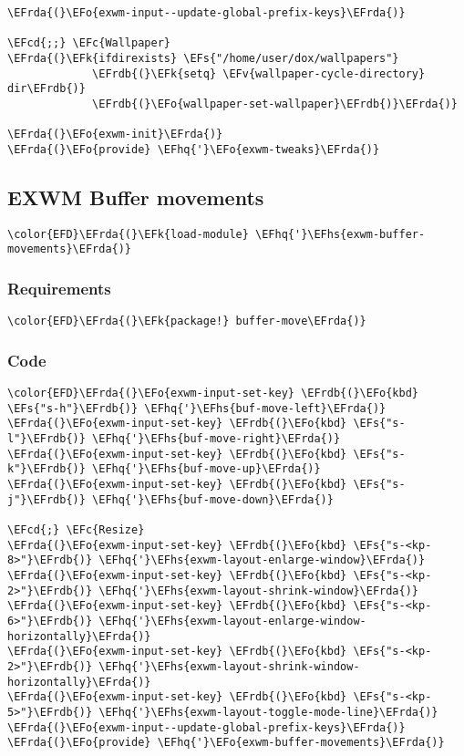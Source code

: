\documentclass[a4wide,10pt]{article}
\newcommand{\EFc}[1]{\textcolor{EFc}{#1}} %
\newcommand{\EFcd}[1]{\textcolor{EFcd}{#1}} %
\newcommand{\EFs}[1]{\textcolor{EFs}{#1}} %
\newcommand{\EFk}[1]{\textcolor{EFk}{#1}} %
\newcommand{\EFv}[1]{\textcolor{EFv}{#1}} %
\newcommand{\EFo}[1]{\textcolor{EFo}{#1}} %
\newcommand{\EFhq}[1]{\textcolor{EFhq}{#1}} %
\newcommand{\EFhs}[1]{\textcolor{EFhs}{#1}} %
\newcommand{\EFrda}[1]{\textcolor{EFrda}{#1}} %
\newcommand{\EFrdb}[1]{\textcolor{EFrdb}{#1}} %
\begin{document}
\begin{Code}
\begin{Verbatim}
\EFrda{(}\EFo{exwm-input--update-global-prefix-keys}\EFrda{)}

\EFcd{;;} \EFc{Wallpaper}
\EFrda{(}\EFk{ifdirexists} \EFs{"/home/user/dox/wallpapers"}
             \EFrdb{(}\EFk{setq} \EFv{wallpaper-cycle-directory} dir\EFrdb{)}
             \EFrdb{(}\EFo{wallpaper-set-wallpaper}\EFrdb{)}\EFrda{)}

\EFrda{(}\EFo{exwm-init}\EFrda{)}
\EFrda{(}\EFo{provide} \EFhq{'}\EFo{exwm-tweaks}\EFrda{)}
\end{Verbatim}
\end{Code}
\subsection{EXWM Buffer movements}
\label{sec:org358f9a7}
\begin{Code}
\begin{Verbatim}
\color{EFD}\EFrda{(}\EFk{load-module} \EFhq{'}\EFhs{exwm-buffer-movements}\EFrda{)}
\end{Verbatim}
\end{Code}
\subsubsection{Requirements}
\label{sec:orgc960519}
\begin{Code}
\begin{Verbatim}
\color{EFD}\EFrda{(}\EFk{package!} buffer-move\EFrda{)}
\end{Verbatim}
\end{Code}
\subsubsection{Code}
\label{sec:orge3468ce}
\begin{Code}
\begin{Verbatim}
\color{EFD}\EFrda{(}\EFo{exwm-input-set-key} \EFrdb{(}\EFo{kbd} \EFs{"s-h"}\EFrdb{)} \EFhq{'}\EFhs{buf-move-left}\EFrda{)}
\EFrda{(}\EFo{exwm-input-set-key} \EFrdb{(}\EFo{kbd} \EFs{"s-l"}\EFrdb{)} \EFhq{'}\EFhs{buf-move-right}\EFrda{)}
\EFrda{(}\EFo{exwm-input-set-key} \EFrdb{(}\EFo{kbd} \EFs{"s-k"}\EFrdb{)} \EFhq{'}\EFhs{buf-move-up}\EFrda{)}
\EFrda{(}\EFo{exwm-input-set-key} \EFrdb{(}\EFo{kbd} \EFs{"s-j"}\EFrdb{)} \EFhq{'}\EFhs{buf-move-down}\EFrda{)}

\EFcd{;} \EFc{Resize}
\EFrda{(}\EFo{exwm-input-set-key} \EFrdb{(}\EFo{kbd} \EFs{"s-<kp-8>"}\EFrdb{)} \EFhq{'}\EFhs{exwm-layout-enlarge-window}\EFrda{)}
\EFrda{(}\EFo{exwm-input-set-key} \EFrdb{(}\EFo{kbd} \EFs{"s-<kp-2>"}\EFrdb{)} \EFhq{'}\EFhs{exwm-layout-shrink-window}\EFrda{)}
\EFrda{(}\EFo{exwm-input-set-key} \EFrdb{(}\EFo{kbd} \EFs{"s-<kp-6>"}\EFrdb{)} \EFhq{'}\EFhs{exwm-layout-enlarge-window-horizontally}\EFrda{)}
\EFrda{(}\EFo{exwm-input-set-key} \EFrdb{(}\EFo{kbd} \EFs{"s-<kp-2>"}\EFrdb{)} \EFhq{'}\EFhs{exwm-layout-shrink-window-horizontally}\EFrda{)}
\EFrda{(}\EFo{exwm-input-set-key} \EFrdb{(}\EFo{kbd} \EFs{"s-<kp-5>"}\EFrdb{)} \EFhq{'}\EFhs{exwm-layout-toggle-mode-line}\EFrda{)}
\EFrda{(}\EFo{exwm-input--update-global-prefix-keys}\EFrda{)}
\EFrda{(}\EFo{provide} \EFhq{'}\EFo{exwm-buffer-movements}\EFrda{)}
\end{Verbatim}
\end{Code}
\end{document}
